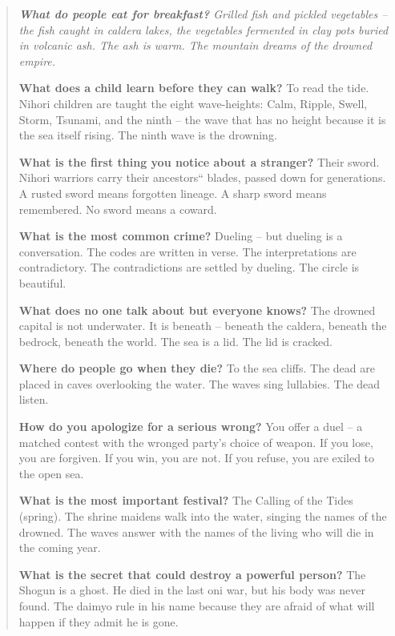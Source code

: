 \documentclass[12pt,oneside]{book}
\newenvironment{almanac}
  {\begin{quote}\small\itshape}
  {\end{quote}}
\begin{document}
\vspace{1em}
\begin{almanac}
\textbf{What do people eat for breakfast?} Grilled fish and pickled vegetables -- the fish caught in caldera lakes, the vegetables fermented in clay pots buried in volcanic ash. The ash is warm. The mountain dreams of the drowned empire.

\textbf{What does a child learn before they can walk?} To read the tide. Nihori children are taught the eight wave-heights: Calm, Ripple, Swell, Storm, Tsunami, and the ninth -- the wave that has no height because it is the sea itself rising. The ninth wave is the drowning.

\textbf{What is the first thing you notice about a stranger?} Their sword. Nihori warriors carry their ancestors`` blades, passed down for generations. A rusted sword means forgotten lineage. A sharp sword means remembered. No sword means a coward.

\textbf{What is the most common crime?} Dueling -- but dueling is a conversation. The codes are written in verse. The interpretations are contradictory. The contradictions are settled by dueling. The circle is beautiful.

\textbf{What does no one talk about but everyone knows?} The drowned capital is not underwater. It is beneath -- beneath the caldera, beneath the bedrock, beneath the world. The sea is a lid. The lid is cracked.

\textbf{Where do people go when they die?} To the sea cliffs. The dead are placed in caves overlooking the water. The waves sing lullabies. The dead listen.

\textbf{How do you apologize for a serious wrong?} You offer a duel -- a matched contest with the wronged party's choice of weapon. If you lose, you are forgiven. If you win, you are not. If you refuse, you are exiled to the open sea.

\textbf{What is the most important festival?} The Calling of the Tides (spring). The shrine maidens walk into the water, singing the names of the drowned. The waves answer with the names of the living who will die in the coming year.

\textbf{What is the secret that could destroy a powerful person?} The Shogun is a ghost. He died in the last oni war, but his body was never found. The daimyo rule in his name because they are afraid of what will happen if they admit he is gone.
\end{almanac}

\newpage

\newpage
\end{document}
